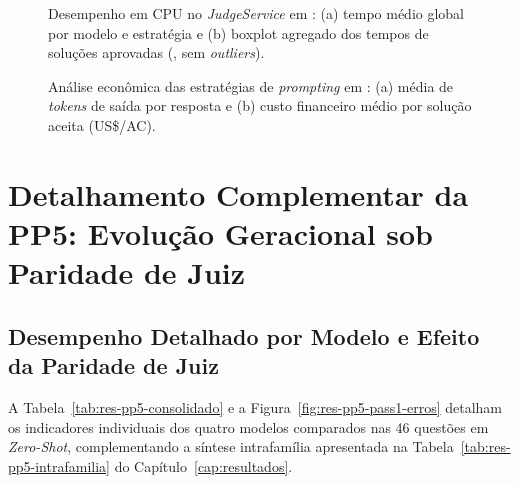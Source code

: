 \begin{figure}[!htbp]
\centering

\caption[Tempos médios e distribuição AC por estratégia na PP4]{Desempenho em CPU no \textit{JudgeService} em : (a) tempo médio global por modelo e estratégia e (b) boxplot agregado dos tempos de soluções aprovadas (, sem \textit{outliers}).}
\label{fig:res-pp4-tempo}
\end{figure}

\begin{figure}[!htbp]
\centering

\caption[Tokens de saída e custo por AC por estratégia na PP4]{Análise econômica das estratégias de \textit{prompting} em : (a) média de \textit{tokens} de saída por resposta e (b) custo financeiro médio por solução aceita (US\$/AC).}
\label{fig:res-pp4-tokens-custo}
\end{figure}
\FloatBarrier

\section{Detalhamento Complementar da PP5: Evolução Geracional sob Paridade de Juiz}\label{ap:pp5-detalhes}

\subsection{Desempenho Detalhado por Modelo e Efeito da Paridade de Juiz}\label{sec:res-rq5-pass1}

A Tabela~\ref{tab:res-pp5-consolidado} e a Figura~\ref{fig:res-pp5-pass1-erros} detalham os indicadores individuais dos quatro modelos comparados nas 46 questões em  \textit{Zero-Shot}, complementando a síntese intrafamília apresentada na Tabela~\ref{tab:res-pp5-intrafamilia} do Capítulo~\ref{cap:resultados}.

